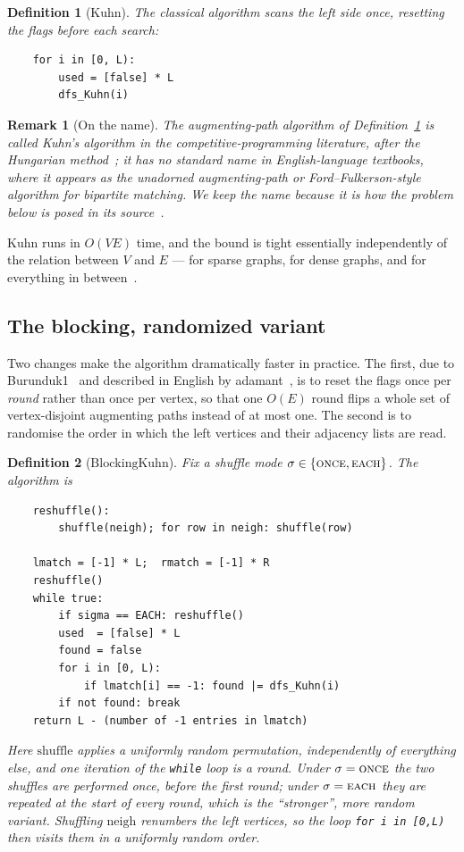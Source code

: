 \documentclass[10pt]{article}
\newtheorem{definition}{Definition}
\newtheorem{remark}[theorem]{Remark}
\newcommand{\Kuhn}{\text{Kuhn}}
\newcommand{\BKuhn}{\text{BlockingKuhn}}
\newcommand{\ONCE}{\textup{\textsc{once}}}
\newcommand{\EACH}{\textup{\textsc{each}}}
\begin{document}
\begin{definition}[$\Kuhn$]\label{def:kuhn}
The classical algorithm scans the left side once, resetting the flags before
each search:
\begin{verbatim}
    for i in [0, L):
        used = [false] * L
        dfs_Kuhn(i)
\end{verbatim}
\end{definition}

\begin{remark}[On the name]\label{rem:name}
The augmenting-path algorithm of Definition~\ref{def:kuhn} is called
\emph{Kuhn's algorithm} in the competitive-programming literature, after the
Hungarian method~\cite{Kuhn55}; it has no standard name in English-language
textbooks, where it appears as the unadorned augmenting-path or
Ford--Fulkerson-style algorithm for bipartite matching. We keep the name
because it is how the problem below is posed in its source~\cite{Kaban19}.
\end{remark}

$\Kuhn$ runs in $O(VE)$ time, and the bound is tight essentially independently
of the relation between $V$ and $E$ --- for sparse graphs, for dense graphs, and
for everything in between~\cite[\S1]{Kaban19}.

\subsection{The blocking, randomized variant}

Two changes make the algorithm dramatically faster in practice. The first,
due to Burunduk1~\cite{Burunduk1} and described in English by
adamant~\cite{Adamant23}, is to reset the flags once per \emph{round} rather
than once per vertex, so that one $O(E)$ round flips a whole set of
vertex-disjoint augmenting paths instead of at most one. The second is to
randomise the order in which the left vertices and their adjacency lists are
read.

\begin{definition}[$\BKuhn$]\label{def:alg}
Fix a shuffle mode $\sigma\in\{\ONCE,\EACH\}$. The algorithm is
\begin{verbatim}
    reshuffle():
        shuffle(neigh); for row in neigh: shuffle(row)

    lmatch = [-1] * L;  rmatch = [-1] * R
    reshuffle()
    while true:
        if sigma == EACH: reshuffle()
        used  = [false] * L
        found = false
        for i in [0, L):
            if lmatch[i] == -1: found |= dfs_Kuhn(i)
        if not found: break
    return L - (number of -1 entries in lmatch)
\end{verbatim}
Here $\mathrm{shuffle}$ applies a uniformly random permutation, independently
of everything else, and one iteration of the \texttt{while} loop is a
\emph{round}. Under $\sigma=\ONCE$ the two shuffles are performed once,
before the first round; under $\sigma=\EACH$ they are repeated at the
start of every round, which is the ``stronger'', more random variant. Shuffling
$\mathrm{neigh}$ renumbers the left vertices, so the loop
\texttt{for i in [0,L)} then visits them in a uniformly random order.
\end{definition}
\end{document}
